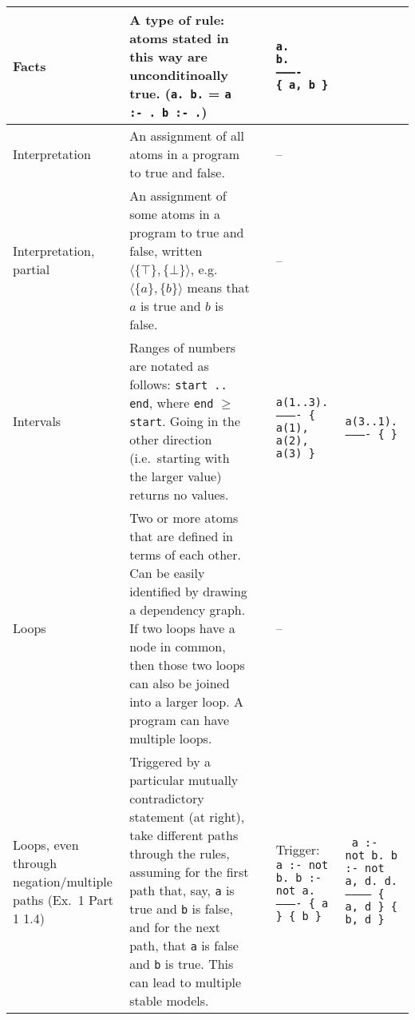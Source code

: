 \documentclass[9pt,a4paper,landscape]{article}
\begin{document}
{\begin{longtable}{Lp{14.5cm}lXX}
Facts
& A type of rule: atoms stated in this way are unconditinoally true. (\texttt{a. b.} = \texttt{a :- . b :- .})
&& \texttt{a. \newline
	b. \newline
	---------- \newline
	\{ a, b \} } &\\ \midrule


Interpretation
& An assignment of all atoms in a program to true and false.
&& -- &\\ \midrule

Interpretation, partial
& An assignment of some atoms in a program to true and false, written $\langle \{\top\}, \{\bot\} \rangle$, e.g.\ $\langle \{a\}, \{b\} \rangle$ means that $a$ is true and $b$ is false.
&& -- &\\ \midrule

Intervals
& Ranges of numbers are notated as follows: \texttt{start .. end}, where \texttt{end} $\geq$ \texttt{start}. 
Going in the other direction (i.e.\ starting with the larger value) returns no values.
&& \texttt{%
	a(1..3). \newline
	---------- \newline
	\{ a(1), a(2), a(3) \}} 
& \texttt{%
	a(3..1). \newline
	---------- \newline
	\{ \}}
\\ \midrule

Loops
& Two or more atoms that are defined in terms of each other. Can be easily identified by drawing a dependency graph.
If two loops have a node in common, then those two loops can also be joined into a larger loop.
A program can have multiple loops.
&& -- &\\ \midrule

Loops, even \newline through negation\slash \newline multiple paths \newline (Ex.\ 1 Part 1  1.4)
& Triggered by a particular mutually contradictory statement (at right), take different paths through the rules, assuming for the first path that, say, \texttt{a} is true and \texttt{b} is false, and for the next path, that \texttt{a} is false and \texttt{b} is true.
This can lead to multiple stable models.

&& Trigger: \newline
\texttt{%
	a :- not b. \newline
	b :- not a. \newline
	---------- \newline
	\{ a \} \newline
	\{ b \}}
& \texttt{%
	a :- not b. \newline
	b :- not a, d. \newline
	d. \newline
	----------- \newline
	\{ a, d \} \newline
	\{ b, d \}} \newline \\ %



\end{longtable}}
\end{document}
